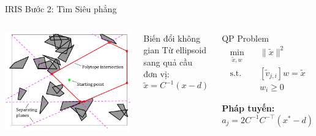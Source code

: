 \documentclass[aspectratio=169]{beamer}
\begin{document}
\begin{frame}{IRIS Bước 2: Tìm Siêu phẳng}
    \begin{columns}[c]
        \includegraphics[width=\textwidth]{../imgs/iris_algo_1.png}

        \begin{block}{Biến đổi không gian}
            \small
            Từ ellipsoid sang quả cầu đơn vị:
            \[
                \tilde{x} = C^{-1}(x - d)
            \]
        \end{block}

        \begin{block}{QP Problem}
            \small
            \[
                \begin{aligned}
                    \min_{\tilde{x}, w} \quad & \|\tilde{x}\|^2                \\
                    \text{s.t.} \quad         & [\tilde{v}_{j,i}]w = \tilde{x} \\
                                              & w_i \geq 0
                \end{aligned}
            \]

            \textbf{Pháp tuyến:}
            \[
                a_j = 2C^{-1}C^{-\top}(x^* - d)
            \]
        \end{block}
    \end{columns}
\end{frame}
\end{document}
